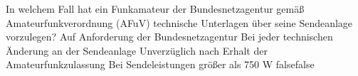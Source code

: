     {In welchem Fall hat ein Funkamateur der Bundesnetzagentur gemäß Amateurfunkverordnung (AFuV) technische Unterlagen über seine Sendeanlage vorzulegen?}
    {Auf Anforderung der Bundesnetzagentur}
    {Bei jeder technischen Änderung an der Sendeanlage}
    {Unverzüglich nach Erhalt der Amateurfunkzulassung}
    {Bei Sendeleistungen größer als 750 W}
    {false}{false}